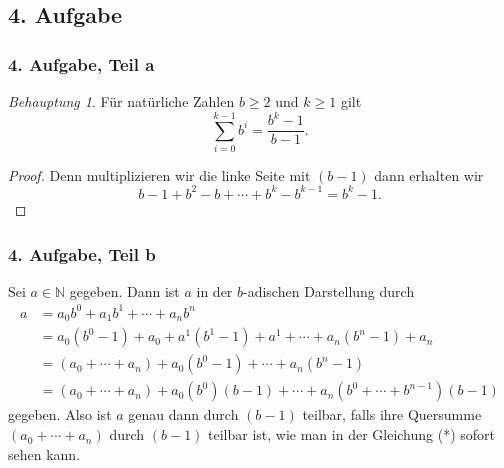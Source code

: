 \documentclass[draft,a5paper]{article}
\theoremstyle{remark}
\newtheorem*{Behauptung}{Behauptung}
\begin{document}
\subsection{4. Aufgabe}
\subsubsection{4. Aufgabe, Teil a}
\begin{Behauptung}
  Für natürliche Zahlen \(b \ge 2\) und \(k \ge 1\) gilt
  \[\sum_{i=0}^{k-1}{b^{i}} = \frac{b^{k}-1}{b-1}.\]
\end{Behauptung}
\begin{proof}
  Denn multiplizieren wir die linke Seite mit \((b-1)\) dann erhalten
  wir
  \[b - 1 + b^{2} - b + \cdots + b^{k} - b^{k-1} = b^{k} - 1.\]
\end{proof}
\subsubsection{4. Aufgabe, Teil b}
Sei \(a \in \mathbb{N}\) gegeben.  Dann ist \(a\) in der \(b\)-adischen Darstellung
durch
\begin{align*}
  a &= a_{0}b^{0} + a_{1}b^{1} + \cdots + a_{n}b^{n} \\
    &= a_{0}(b^{0} - 1) +  a_{0} + a^{1}(b^{1} - 1) + a^{1} + \cdots +
      a_{n}(b^{n} - 1) + a_{n} \\
    &= (a_{0} + \cdots + a_{n}) + a_{0}(b^{0} - 1) + \cdots + a_{n}(b^{n} - 1) \\
  &= (a_{0} + \cdots + a_{n}) + a_{0}(b^{0})(b-1) + \cdots + a_{n}(b^{0} +
    \cdots + b^{n-1})(b-1) \tag*{(*)}
\end{align*}
gegeben.  Also ist \(a\) genau dann durch \((b-1)\) teilbar, falls ihre
Quersumme \((a_{0}+ \cdots +a_{n})\) durch \((b-1)\) teilbar ist, wie man in
der Gleichung (*) sofort sehen kann.
\end{document}
